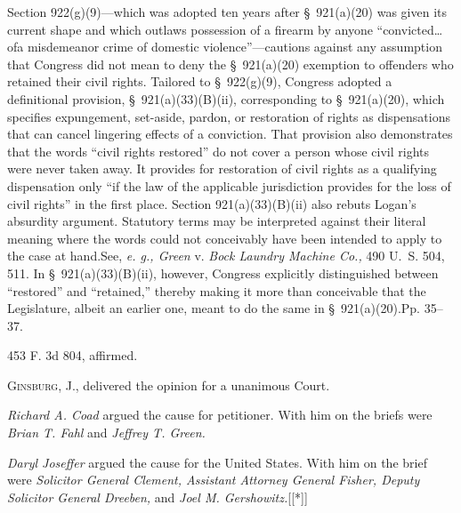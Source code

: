   Section 922(g)(9)---which was adopted ten years after \S~921(a)(20) was given its current shape and which outlaws possession of a firearm by anyone ``convicted\dots ofa misdemeanor crime of domestic violence''---cautions against any assumption that Congress did not mean to deny the \S~921(a)(20) exemption to offenders who retained their civil rights. Tailored to \S~922(g)(9), Congress adopted a definitional provision, \S~921(a)(33)(B)(ii), corresponding to \S~921(a)(20), which specifies expungement, set-aside, pardon, or restoration of rights as dispensations that can cancel lingering effects of a conviction. That provision also demonstrates that the words ``civil rights restored'' do not cover a person whose civil rights were never taken away. It provides for restoration of civil rights as a qualifying dispensation only ``if the law of the applicable jurisdiction provides for the loss of civil rights'' in the first place. Section 921(a)(33)(B)(ii) also rebuts Logan's absurdity argument. Statutory terms may be interpreted against their literal meaning where the words could not conceivably have been intended to apply to the case at hand.See, \emph{e. g., Green} v. \emph{Bock Laundry Machine Co.,} 490 U.~S. 504, 511. In \S~921(a)(33)(B)(ii), however, Congress explicitly distinguished between ``restored'' and ``retained,'' thereby making it more than conceivable that the Legislature, albeit an earlier one, meant to do the same in \S~921(a)(20).Pp. 35--37.

453 F. 3d 804, affirmed.\newpage 

  \textsc{Ginsburg,} J., delivered the opinion for a unanimous Court.

  \emph{Richard A. Coad} argued the cause for petitioner. With him on the briefs were \emph{Brian T. Fahl} and \emph{Jeffrey T. Green.}

  \emph{Daryl Joseffer} argued the cause for the United States. With him on the brief were \emph{Solicitor General Clement, Assistant Attorney General Fisher, Deputy Solicitor General Dreeben,} and \emph{Joel M. Gershowitz.}[[*]]


